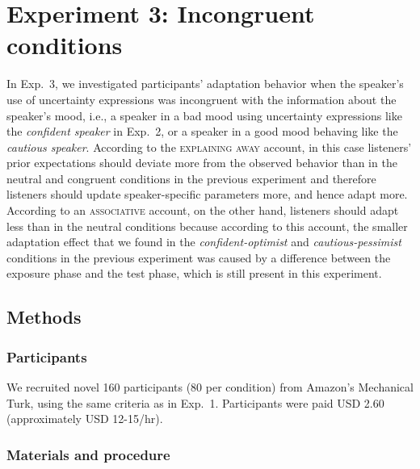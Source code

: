 \documentclass[man,floatsintext]{apa6}
\begin{document}
\section{Experiment 3: Incongruent conditions}

In Exp.~3, we investigated participants' adaptation behavior when the speaker's use of uncertainty expressions was incongruent with the information about the speaker's mood, i.e., a speaker in a bad mood using uncertainty expressions like the \textit{confident speaker} in Exp.~2, or a speaker in a good mood behaving like the \textit{cautious speaker}. According to the \textsc{explaining away} account, in this case listeners' prior expectations should deviate more from the observed behavior than in the neutral and congruent conditions in the previous experiment and therefore listeners should update speaker-specific parameters more, and hence adapt more.  According to an \textsc{associative} account, on the other hand, listeners should adapt less than in the neutral conditions because according to this account, the smaller adaptation effect that we found in the \textit{confident-optimist} and \textit{cautious-pessimist} conditions in the previous experiment was caused by a difference between the exposure phase and the test phase, which is still present in this experiment.


\subsection{Methods}

\subsubsection{Participants} We recruited novel 160 participants (80 per condition) from Amazon's Mechanical Turk, using the same criteria as in Exp.~1. Participants were paid USD 2.60 (approximately USD 12-15/hr).


\subsubsection{Materials and procedure}
\end{document}
